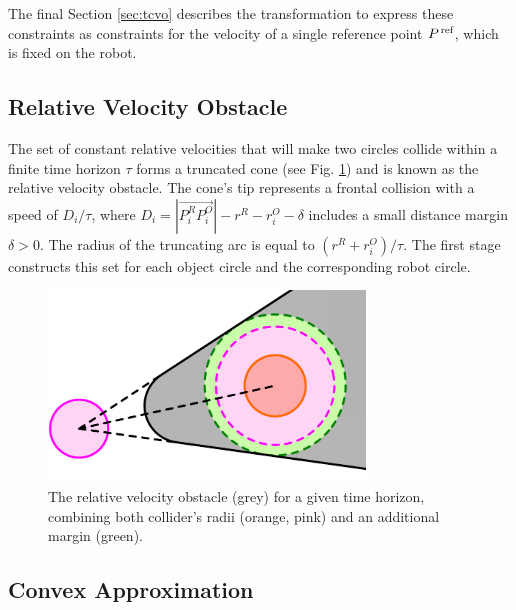 \documentclass{article}
\begin{document}
The final Section \ref{sec:tcvo} describes the transformation to express these constraints as constraints for the velocity of a single reference point $ P^\text{\,ref} $, which is fixed on the robot.

\subsection{Relative Velocity Obstacle}\label{sec:vo}

The set of constant relative velocities that will make two circles collide within a finite time horizon $ \tau $ forms a truncated cone (see Fig. \ref{fig:vo}) and is known as the relative velocity obstacle. The cone's tip represents a frontal collision with a speed of $ D_i/\tau $, where $ D_i = \left|\overrightarrow{P_i^R P_i^O}\right|- r^R - r_i^O - \delta $ includes a small distance margin $ \delta > 0 $. The radius of the truncating arc is equal to $ (r^R + r_i^O)/\tau $. The first stage constructs this set for each object circle and the corresponding robot circle.

\begin{figure}
	\begin{center}
		\includegraphics[width=0.75\textwidth]{vo.pdf}
	\end{center}
	\caption{The relative velocity obstacle (grey) for a given time horizon, combining both collider's radii (orange, pink) and an additional margin (green). %
	}\label{fig:vo}
\end{figure}


\subsection{Convex Approximation}\label{sec:cvo}
\end{document}
